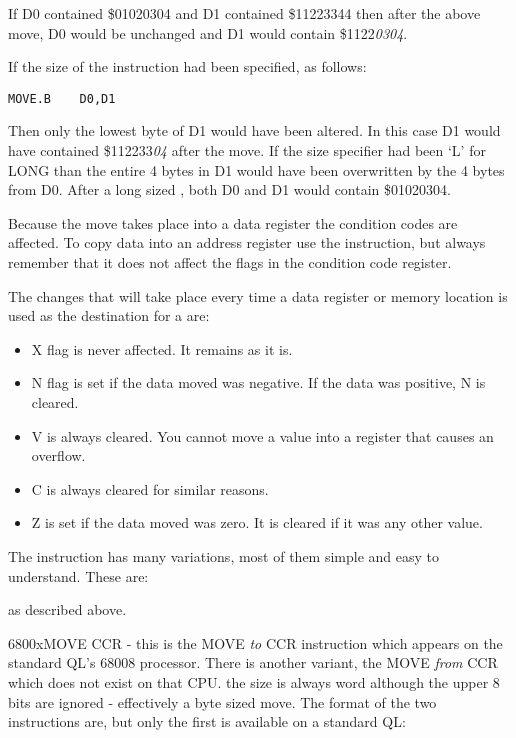 If D0 contained \$01020304 and D1 contained \$11223344 then after the
    above move, D0 would be unchanged and D1 would contain
    \$1122\emph{0304}. 
    
If the size of the instruction had been
    specified, as follows:
\begin{lstlisting}[firstnumber=1,]
          MOVE.B    D0,D1
\end{lstlisting}
     Then only the lowest byte of D1 would have been altered. In this case D1
    would have contained \$112233\emph{04} after the move. If the
    size specifier had been `L' for LONG than the entire 4 bytes in D1 would
    have been overwritten by the 4 bytes from D0. After a long sized ,
    both D0 and D1 would contain \$01020304.

Because the move takes place into a data register the condition
    codes are affected. To copy data into an address register use the 
    instruction, but always remember that it does not affect the flags in the
    condition code register.

The changes that will take place every time a data register or
    memory location is used as the destination for a  are:
\begin{itemize}[itemsep=0pt]

\item{}X flag is never affected. It remains as it is.


\item{}N flag is set if the data moved was negative. If the data was
        positive, N is cleared.


\item{}V is always cleared. You cannot move a value into a register
        that causes an overflow.


\item{}C is always cleared for similar reasons.


\item{}Z is set if the data moved was zero. It is cleared if it was any
        other value.

\end{itemize}

The  instruction has many variations, most of them simple and
    easy to understand. These are:

 as described above.

\mc6800x{MOVE CCR} -{} this is the MOVE \emph{to} CCR instruction which appears on the standard QL's 68008 processor.
There is another variant, the MOVE \emph{from} CCR which does not exist on that CPU. the size is always word although the upper 8 bits are
    ignored -{} effectively a byte sized move. The format of the two instructions are, but only the first is available on a standard QL:

